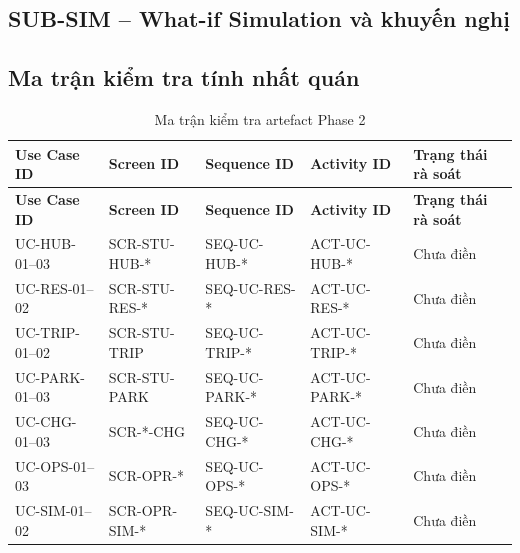\clearpage
\subsection{SUB-SIM -- What-if Simulation và khuyến nghị}

\clearpage
\subsection{Ma trận kiểm tra tính nhất quán}

\begin{longtable}{|L{20mm}|L{25mm}|L{26mm}|L{27mm}|L{30mm}|}
  \caption{Ma trận kiểm tra artefact Phase 2}\label{tab:phase2-consistency}\\
  \hline
  \textbf{Use Case ID} & \textbf{Screen ID} & \textbf{Sequence ID} & \textbf{Activity ID} & \textbf{Trạng thái rà soát}\\\hline
  \endfirsthead
  \hline
  \textbf{Use Case ID} & \textbf{Screen ID} & \textbf{Sequence ID} & \textbf{Activity ID} & \textbf{Trạng thái rà soát}\\\hline
  \endhead
  UC-HUB-01--03 & SCR-STU-HUB-* & SEQ-UC-HUB-* & ACT-UC-HUB-* & Chưa điền\\\hline
  UC-RES-01--02 & SCR-STU-RES-* & SEQ-UC-RES-* & ACT-UC-RES-* & Chưa điền\\\hline
  UC-TRIP-01--02 & SCR-STU-TRIP & SEQ-UC-TRIP-* & ACT-UC-TRIP-* & Chưa điền\\\hline
  UC-PARK-01--03 & SCR-STU-PARK & SEQ-UC-PARK-* & ACT-UC-PARK-* & Chưa điền\\\hline
  UC-CHG-01--03 & SCR-*-CHG & SEQ-UC-CHG-* & ACT-UC-CHG-* & Chưa điền\\\hline
  UC-OPS-01--03 & SCR-OPR-* & SEQ-UC-OPS-* & ACT-UC-OPS-* & Chưa điền\\\hline
  UC-SIM-01--02 & SCR-OPR-SIM-* & SEQ-UC-SIM-* & ACT-UC-SIM-* & Chưa điền\\\hline
\end{longtable}
